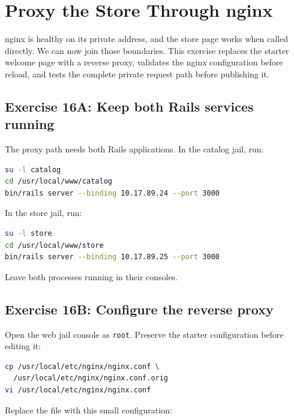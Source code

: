 \chapter{Proxy the Store Through nginx}

nginx is healthy on its private address, and the store page works when called
directly. We can now join those boundaries. This exercise replaces the starter
welcome page with a reverse proxy, validates the nginx configuration before
reload, and tests the complete private request path before publishing it.

\section{Exercise 16A: Keep both Rails services running}

The proxy path needs both Rails applications. In the catalog jail, run:

\begin{lstlisting}[language=sh]
su -l catalog
cd /usr/local/www/catalog
bin/rails server --binding 10.17.89.24 --port 3000
\end{lstlisting}

In the store jail, run:

\begin{lstlisting}[language=sh]
su -l store
cd /usr/local/www/store
bin/rails server --binding 10.17.89.25 --port 3000
\end{lstlisting}

Leave both processes running in their consoles.

\section{Exercise 16B: Configure the reverse proxy}

Open the web jail console as \texttt{root}. Preserve the starter configuration
before editing it:

\begin{lstlisting}[language=sh]
cp /usr/local/etc/nginx/nginx.conf \
  /usr/local/etc/nginx/nginx.conf.orig
vi /usr/local/etc/nginx/nginx.conf
\end{lstlisting}

Replace the file with this small configuration:

